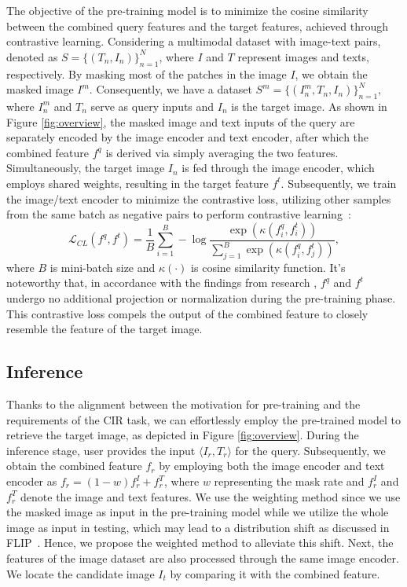 \documentclass[10pt,twocolumn,letterpaper]{article}
\begin{document}
The objective of the pre-training model is to minimize the cosine similarity between the combined query features and the target features, achieved through contrastive learning. Considering a multimodal dataset with image-text pairs, denoted as $S = \{(T_n, I_n)\}^N_{n=1}$, where $I$ and $T $ represent images and texts, respectively. By masking most of the patches in the image $I$, we obtain the masked image $I^m$. Consequently, we have a dataset $S^m = \{(I_n^m, T_n, I_n)\}^{N}_{n=1}$, where $I_n^m$ and $T_n$ serve as query inputs and $I_n$ is the target image. As shown in Figure \ref{fig:overview}, the masked image and text inputs of the query are separately encoded by the image encoder and text encoder, after which the combined feature $f^q$ is derived via simply averaging the two features. Simultaneously, the target image $I_n$ is fed through the image encoder, which employs shared weights, resulting in the target feature $f^t$. Subsequently, we train the image/text encoder to minimize the contrastive loss, utilizing other samples from the same batch as negative pairs to perform contrastive learning~\cite{chen2020simple}:
\begin{equation}
    \mathcal{L}_{CL}\left(f^q,f^t\right)=\frac1B\sum_{i=1}^B-\log\frac{\exp\left(\kappa\left(f^q_i,f^t_i\right)\right)}{\sum_{j=1}^B\exp\left(\kappa\left(f^q_i,f^t_j\right)\right)},
\end{equation} where $B$ is mini-batch size and $\kappa(\cdot)$ is cosine similarity function. It's noteworthy that, in accordance with the findings from research \cite{liu2023bi}, $f^q$ and $f^t$ undergo no additional projection or normalization during the pre-training phase. This contrastive loss compels the output of the combined feature to closely resemble the feature of the target image.

\subsection{Inference}
Thanks to the alignment between the motivation for pre-training and the requirements of the CIR task, we can effortlessly employ the pre-trained model to retrieve the target image, as depicted in Figure \ref{fig:overview}. During the inference stage, user provides the input $\langle I_r, T_r \rangle$ for the query. Subsequently, we obtain the combined feature $f_r$ by employing both the image encoder and text encoder as $f_r = (1-w)f_r^I + f_r^T$, where $w$ representing the mask rate and $f_r^I$ and $f_r^T$ denote the image and text features. We use the weighting method since we use the masked image as input in the pre-training model while we utilize the whole image as input in testing, which may lead to a distribution shift as discussed in FLIP~\cite{li2023scaling}. Hence, we propose the weighted method to alleviate this shift. Next, the features of the image dataset are also processed through the same image encoder. We locate the candidate image $I_t$ by comparing it with the combined feature. 
\end{document}
